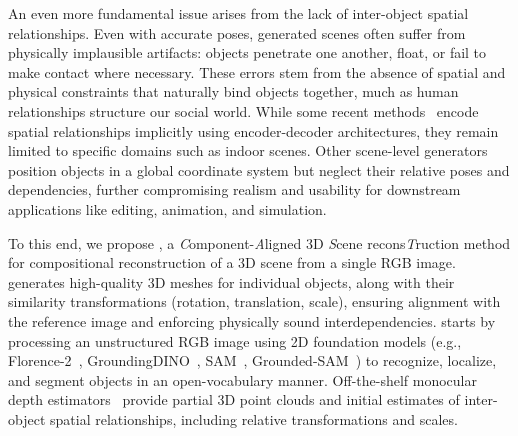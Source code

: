 An even more fundamental issue arises from the lack of inter-object spatial relationships. Even with accurate poses, generated scenes often suffer from physically implausible artifacts: objects penetrate one another, float, or fail to make contact where necessary. These errors stem from the absence of spatial and physical constraints that naturally bind objects together, much as human relationships structure our social world. While some recent methods~\cite{liu2022towards,zhang2024improving} encode spatial relationships implicitly using encoder-decoder architectures, they remain limited to specific domains such as indoor scenes. Other scene-level generators~\cite{dogaru2024generalizable} position objects in a global coordinate system but neglect their relative poses and dependencies, further compromising realism and usability for downstream applications like editing, animation, and simulation.

To this end, we propose \methodname, a \emph{C}omponent-\emph{A}ligned 3D \emph{S}cene recons\emph{T}ruction method for compositional reconstruction of a 3D scene from a single RGB image. \methodname generates high-quality 3D meshes for individual objects, along with their similarity transformations (rotation, translation, scale), ensuring alignment with the reference image and enforcing physically sound interdependencies. \methodname starts by processing an unstructured RGB image using 2D foundation models (e.g., Florence-2~\cite{xiao2024florence}, GroundingDINO~\cite{liu2025grounding}, SAM~\cite{ravi2024sam}, Grounded-SAM~\cite{ren2024grounded}) to recognize, localize, and segment objects in an open-vocabulary manner. Off-the-shelf monocular depth estimators~\cite{wang2024moge} provide partial 3D point clouds and initial estimates of inter-object spatial relationships, including relative transformations and scales.

